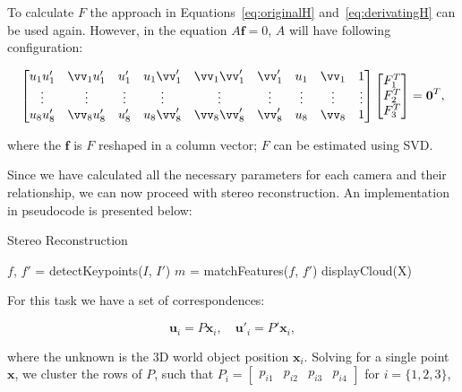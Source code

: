 \documentclass[12pt]{article}
\begin{document}
To calculate $F$ the approach in Equations~\ref{eq:originalH} and~\ref{eq:derivatingH} can be used again.
However, in the equation $A\mathbf{f} = 0$, $A$ will have following configuration:

\begin{equation}
\begin{bmatrix}
u_1 u_1' & 	\vv_1 u_1' & u_1' & u_1 \vv_1' & \vv_1 \vv_1' & \vv_1' & u_1 & \vv_1 & 1 \\
\vdots & \vdots & \vdots & \vdots & \vdots & \vdots & \vdots & \vdots & \vdots  \\
u_8 u_8' & \vv_8 u_8' & u_8' & u_8 \vv_8' & \vv_8 \vv_8' & \vv_8' & u_8 & \vv_8 & 1 
\end{bmatrix}
\begin{bmatrix}
F_1^T \\
F_2^T \\
F_3^T \\
\end{bmatrix}
= \mathbf{0}^T,
\end{equation}

where the $\mathbf{f}$ is $F$ reshaped in a column vector; $F$ can be estimated using SVD.

Since we have calculated all the necessary parameters for each camera and their relationship, we can now proceed with stereo reconstruction.
An implementation in pseudocode is presented below:

\begin{algorithm}[H]
 \caption{Stereo Reconstruction}
 $f$, $f'$ = detectKeypoints($I$, $I'$)\;
 $m$ = matchFeatures($f$, $f'$)\;
 displayCloud(X)\;
\end{algorithm}

For this task we have a set of correspondences:

\begin{equation}
 \mathbf{u}_{i} = P\mathbf{x}_i, \quad \mathbf{u'}_{i} = P'\mathbf{x}_i,
\end{equation}

where the unknown is the 3D world object position $\mathbf{x}_i$.
Solving for a single point $\mathbf{x}$, we cluster the rows of $P$, such that $P_i = \begin{bmatrix} p_{i1} & p_{i2} & p_{i3} & p_{i4}  \end{bmatrix}$ for $i = \lbrace 1, 2, 3 \rbrace$,
\end{document}
